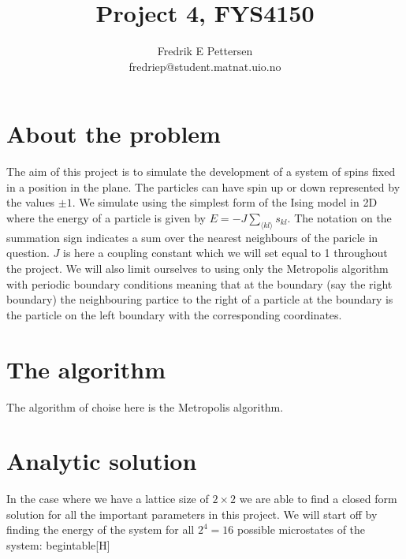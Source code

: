 \documentclass[a4paper,english, 10pt, twoside]{article}
\title{Project 4, FYS4150}
\author{Fredrik E Pettersen\\ fredriep@student.matnat.uio.no}
\begin{document}
\maketitle


\section*{About the problem}
The aim of this project is to simulate the development of a system of spins fixed in a position in the plane. The particles can 
have spin up or down represented by the values $\pm 1$. We simulate using the simplest form of the Ising model in 2D where the energy 
of a particle is given by $E = -J\sum\limits_{\langle kl\rangle}s_{kl}$. The notation on the summation sign indicates a sum over the 
nearest neighbours of the paricle in question. $J$ is here a coupling constant which we will set equal to 1 throughout the project. 
We will also limit ourselves to using only the Metropolis algorithm with periodic boundary conditions meaning that at the boundary 
(say the right boundary) the neighbouring partice to the right of a particle at the boundary is the particle on the left boundary 
with the corresponding coordinates.

\section*{The algorithm}
The algorithm of choise here is the Metropolis algorithm.
\section*{Analytic solution}
In the case where we have a lattice size of $2\times2$ we are able to find a closed form solution for all the important parameters 
in this project. We will start off by finding the energy of the system for all $2^4 = 16$ possible microstates of the system:
begin{table}[H]
 
\end{document}
